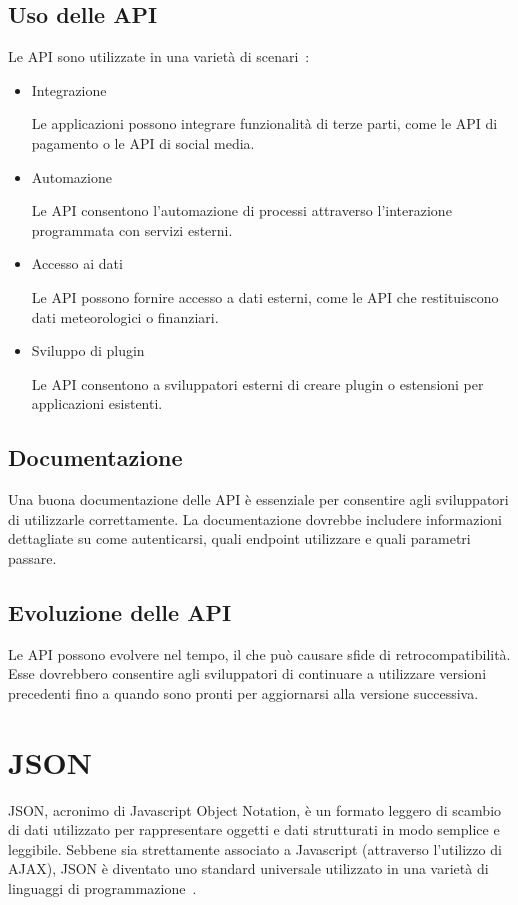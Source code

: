 \subsection{Uso delle API}
Le API sono utilizzate in una varietà di scenari~\cite{API_usage}:
\begin{itemize}
    \item Integrazione
    
    Le applicazioni possono integrare funzionalità di terze parti, come le API di pagamento o le API di social media.

    \item Automazione
    
    Le API consentono l'automazione di processi attraverso l'interazione programmata con servizi esterni.

    \item Accesso ai dati
    
    Le API possono fornire accesso a dati esterni, come le API che restituiscono dati meteorologici o finanziari.

    \item Sviluppo di plugin
    
    Le API consentono a sviluppatori esterni di creare plugin o estensioni per applicazioni esistenti.
\end{itemize}


\subsection{Documentazione}
Una buona documentazione delle API è essenziale per consentire agli sviluppatori di utilizzarle correttamente. La documentazione dovrebbe includere informazioni dettagliate su come autenticarsi, quali endpoint utilizzare e quali parametri passare.

\subsection{Evoluzione delle API}
Le API possono evolvere nel tempo, il che può causare sfide di retrocompatibilità. Esse dovrebbero consentire agli sviluppatori di continuare a utilizzare versioni precedenti fino a quando sono pronti per aggiornarsi alla versione successiva.

\section{JSON}
JSON, acronimo di Javascript Object Notation, è un formato leggero di scambio di dati utilizzato per rappresentare oggetti e dati strutturati in modo semplice e leggibile. Sebbene sia strettamente associato a Javascript (attraverso l'utilizzo di AJAX), JSON è diventato uno standard universale utilizzato in una varietà di linguaggi di programmazione~\cite{JSON, JSON_XML, GeoJSON}.

